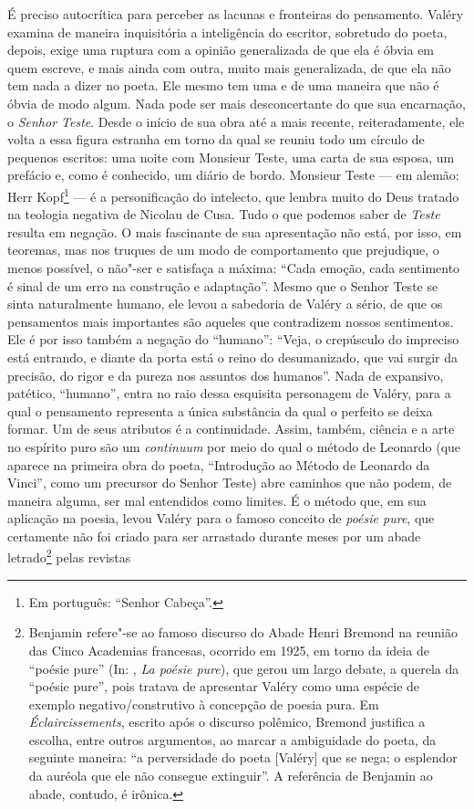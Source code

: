 É preciso autocrítica para perceber as lacunas e fronteiras do
pensamento. Valéry examina de maneira inquisitória a inteligência do
escritor, sobretudo do poeta, depois, exige uma ruptura com a opinião
generalizada de que ela é óbvia em quem escreve, e mais ainda com outra,
muito mais generalizada, de que ela não tem nada a dizer no poeta. Ele
mesmo tem uma e de uma maneira que não é óbvia de modo algum. Nada pode
ser mais desconcertante do que sua encarnação, o \emph{Senhor Teste}.
Desde o início de sua obra até a mais recente, reiteradamente, ele volta
a essa figura estranha em torno da qual se reuniu todo um círculo de
pequenos escritos: uma noite com Monsieur Teste, uma carta de sua
esposa, um prefácio e, como é conhecido, um diário de bordo. Monsieur
Teste --- em alemão: Herr Kopf\footnote{Em português: ``Senhor
  Cabeça''. \versal{[N. T.]}} --- é a personificação do intelecto, que lembra muito do Deus
tratado na teologia negativa de Nicolau de Cusa. Tudo o que podemos
saber de \emph{Teste} resulta em negação. O mais fascinante de sua
apresentação não está, por isso, em teoremas, mas nos truques de um modo
de comportamento que prejudique, o menos possível, o não"-ser e satisfaça
a máxima: ``Cada emoção, cada sentimento é sinal de um erro na construção
e adaptação''. Mesmo que o Senhor Teste se sinta naturalmente humano,
ele levou a sabedoria de Valéry a sério, de que os pensamentos mais
importantes são aqueles que contradizem nossos sentimentos. Ele é por
isso também a negação do ``humano'': ``Veja, o crepúsculo do impreciso está
entrando, e diante da porta está o reino do desumanizado, que vai surgir
da precisão, do rigor e da pureza nos assuntos dos humanos''. Nada de
expansivo, patético, ``humano'', entra no raio dessa esquisita personagem
de Valéry, para a qual o pensamento representa a única substância da
qual o perfeito se deixa formar. Um de seus atributos é a continuidade.
Assim, também, ciência e a arte no espírito puro são um \emph{continuum}
por meio do qual o método de Leonardo (que aparece na primeira obra do
poeta, ``Introdução ao Método de Leonardo da Vinci'', como um precursor do
Senhor Teste) abre caminhos que não podem, de maneira alguma, ser mal
entendidos como limites. É o método que, em sua aplicação na poesia,
levou Valéry para o famoso conceito de \emph{poésie pure}, que
certamente não foi criado para ser arrastado durante meses por um abade
letrado\footnote{Benjamin refere"-se ao famoso discurso do Abade
  Henri Bremond na reunião das Cinco Academias francesas, ocorrido em
  1925, em torno da ideia de ``poésie pure'' (In: , \emph{La
  poésie pure}), que gerou um largo debate, a querela da ``poésie
  pure'', pois tratava de apresentar Valéry como uma espécie de exemplo
  negativo/construtivo à concepção de poesia pura. Em
  \emph{Éclaircissements}, escrito após o discurso polêmico, Bremond
  justifica a escolha, entre outros argumentos, ao marcar a ambiguidade
  do poeta, da seguinte maneira: ``a perversidade do poeta {[}Valéry{]}
  que se nega; o esplendor da auréola que ele não consegue extinguir''.
  A referência de Benjamin ao abade, contudo, é irônica. \versal{[N. E.]}} pelas revistas
